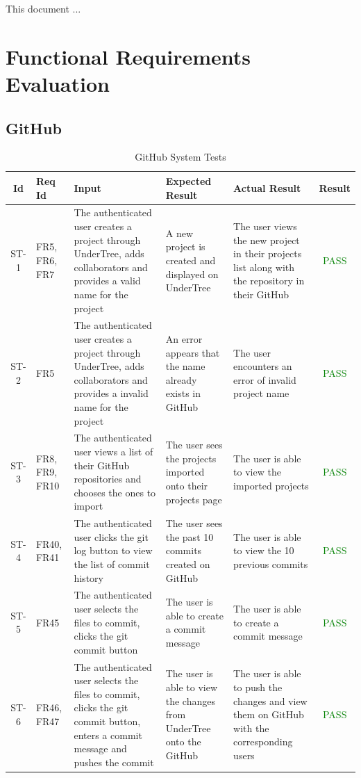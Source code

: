 \documentclass[12pt, titlepage]{article}
\begin{document}
\listoftables %

\listoffigures %

\newpage


This document ...

\section{Functional Requirements Evaluation}

\subsection{GitHub}
\begin{center}
    \begin{longtable}{|c|p{1cm}|p{2.7cm}|p{3cm}|p{3cm}|c|}
        \caption{GitHub System Tests \label{long}}\\
        \hline
        \textbf{Id} & \textbf{Req Id} & \textbf{Input} & \textbf{Expected Result} & \textbf{Actual Result} & \textbf{Result}   \\
        \hline
        ST-1 & FR5, FR6, FR7 & The authenticated user creates a project through UnderTree, adds collaborators and provides a valid name for the project & A new project is created and displayed on UnderTree & The user views the new project in their projects list along with the repository in their GitHub & \textcolor{green}{PASS} \\
        \hline
        ST-2 & FR5 & The authenticated user creates a project through UnderTree, adds collaborators and provides a invalid name for the project & An error appears that the name already exists in GitHub & The user encounters an error of invalid project name & \textcolor{green}{PASS} \\
        \hline
        ST-3 & FR8, FR9, FR10 & The authenticated user views a list of their GitHub repositories and chooses the ones to import & The user sees the projects imported onto their projects page & The user is able to view the imported projects & \textcolor{green}{PASS} \\
        \hline
        ST-4 & FR40, FR41 & The authenticated user clicks the git log button to view the list of commit history & The user sees the past 10 commits created on GitHub & The user is able to view the 10 previous commits & \textcolor{green}{PASS} \\
        \hline
        ST-5 & FR45 & The authenticated user selects the files to commit, clicks the git commit button & The user is able to create a commit message & The user is able to create a commit message & \textcolor{green}{PASS} \\
        \hline
        ST-6 & FR46, FR47 & The authenticated user selects the files to commit, clicks the git commit button, enters a commit message and pushes the commit & The user is able to view the changes from UnderTree onto the GitHub & The user is able to push the changes and view them on GitHub with the corresponding users & \textcolor{green}{PASS} \\
        \hline
    \end{longtable}
\end{center}
\end{document}
